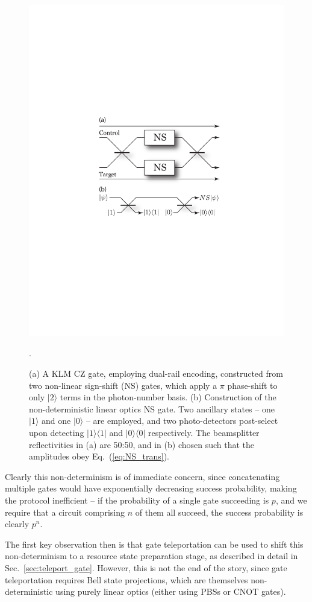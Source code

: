 \documentclass[aps, rmp, twocolumn, amsmath, amssymb, nofootinbib, superscriptaddress, longbibliography, floatfix, table-of-contents, eqsecnum]{revtex4-1}
\newcommand{\bra}[1]{\langle#1|}
\newcommand{\ket}[1]{|#1\rangle}
\begin{document}
\begin{figure}[!htb]
\includegraphics[width=0.8\columnwidth]{KLM_gate}
\caption{(a) A KLM CZ gate, employing dual-rail encoding, constructed from two non-linear sign-shift (NS) gates, which apply a $\pi$ phase-shift to only $\ket{2}$ terms in the photon-number basis. (b) Construction of the non-deterministic linear optics NS gate. Two ancillary states -- one $\ket{1}$ and one $\ket{0}$ -- are employed, and two photo-detectors post-select upon detecting $\ket{1}\bra{1}$ and $\ket{0}\bra{0}$ respectively. The beamsplitter reflectivities in (a) are 50:50, and in (b) chosen such that the amplitudes obey Eq.~(\ref{eq:NS_trans}).}. \label{fig:KLM_gate} 
\end{figure}

Clearly this non-determinism is of immediate concern, since concatenating multiple gates would have exponentially decreasing success probability, making the protocol inefficient -- if the probability of a single gate succeeding is $p$, and we require that a circuit comprising $n$ of them all succeed, the success probability is clearly $p^n$.

The first key observation then is that gate teleportation can be used to shift this non-determinism to a resource state preparation stage, as described in detail in Sec.~\ref{sec:teleport_gate}. However, this is not the end of the story, since gate teleportation requires Bell state projections, which are themselves non-deterministic using purely linear optics (either using PBSs or CNOT gates).
\end{document}
